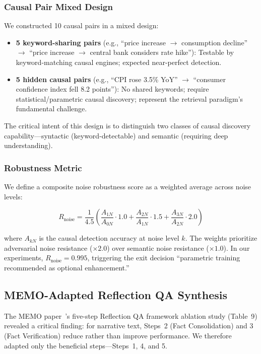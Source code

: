 \documentclass[11pt,a4paper]{article}
\begin{document}
\subsubsection{Causal Pair Mixed Design}

We constructed 10 causal pairs in a mixed design:
\begin{itemize}[itemsep=0pt]
    \item \textbf{5 keyword-sharing pairs} (e.g., ``price increase \(\to\) consumption decline'' \(\to\) ``price increase \(\to\) central bank considers rate hike''): Testable by keyword-matching causal engines; expected near-perfect detection.
    \item \textbf{5 hidden causal pairs} (e.g., ``CPI rose 3.5\% YoY'' \(\to\) ``consumer confidence index fell 8.2 points''): No shared keywords; require statistical/parametric causal discovery; represent the retrieval paradigm's fundamental challenge.
\end{itemize}

The critical intent of this design is to distinguish two classes of causal discovery capability---syntactic (keyword-detectable) and semantic (requiring deep understanding).

\subsubsection{Robustness Metric}

We define a composite noise robustness score as a weighted average across noise levels:

\begin{equation}
R_{\text{noise}} = \frac{1}{4.5} \left( \frac{A_{1N}}{A_{0N}} \cdot 1.0 + \frac{A_{2N}}{A_{1N}} \cdot 1.5 + \frac{A_{3N}}{A_{2N}} \cdot 2.0 \right)
\label{eq:robustness}
\end{equation}

where \(A_{kN}\) is the causal detection accuracy at noise level \(k\). The weights prioritize adversarial noise resistance (\(\times 2.0\)) over semantic noise resistance (\(\times 1.0\)). In our experiments, \(R_{\text{noise}} = 0.995\), triggering the exit decision ``parametric training recommended as optional enhancement.''

\subsection{MEMO-Adapted Reflection QA Synthesis}

The MEMO paper~\cite{memo2025}'s five-step Reflection QA framework ablation study (Table~9) revealed a critical finding: for narrative text, Steps~2 (Fact Consolidation) and 3 (Fact Verification) reduce rather than improve performance. We therefore adapted only the beneficial steps---Steps~1, 4, and 5.
\end{document}
